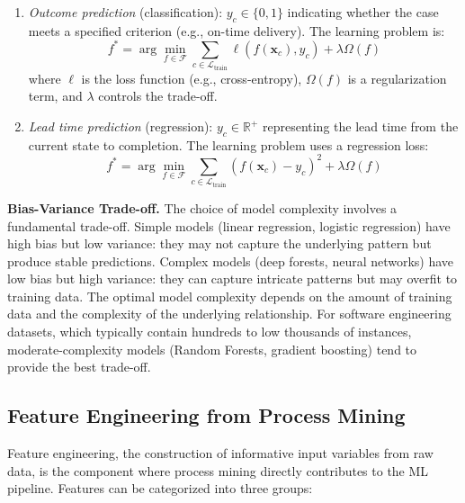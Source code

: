\begin{enumerate}
    \item \emph{Outcome prediction} (classification):
    $y_c \in \{0, 1\}$ indicating whether the case meets a specified
    criterion (e.g., on-time delivery). The learning problem is:
    \begin{equation}
    \label{eq:ml-classification}
    f^* = \arg\min_{f \in \mathcal{F}} \sum_{c \in \mathcal{L}_{\text{train}}}
    \ell(f(\mathbf{x}_c), y_c) + \lambda \Omega(f)
    \end{equation}
    where $\ell$ is the loss function (e.g., cross-entropy), $\Omega(f)$
    is a regularization term, and $\lambda$ controls the trade-off.

    \item \emph{Lead time prediction} (regression):
    $y_c \in \mathbb{R}^+$ representing the lead time from the current
    state to completion. The learning problem uses a regression loss:
    \begin{equation}
    \label{eq:ml-regression}
    f^* = \arg\min_{f \in \mathcal{F}} \sum_{c \in \mathcal{L}_{\text{train}}}
    (f(\mathbf{x}_c) - y_c)^2 + \lambda \Omega(f)
    \end{equation}
\end{enumerate}

\textbf{Bias-Variance Trade-off.} The choice of model complexity involves
a fundamental trade-off. Simple models (linear regression, logistic
regression) have high bias but low variance: they may not capture the
underlying pattern but produce stable predictions. Complex models (deep
forests, neural networks) have low bias but high variance: they can
capture intricate patterns but may overfit to training data. The optimal
model complexity depends on the amount of training data and the
complexity of the underlying relationship. For software engineering
datasets, which typically contain hundreds to low thousands of instances,
moderate-complexity models (Random Forests, gradient boosting) tend to
provide the best trade-off.


\subsection{Feature Engineering from Process Mining}
\label{sec:ml-feature-eng}

Feature engineering, the construction of informative input variables from
raw data, is the component where process mining directly contributes to
the ML pipeline. Features can be categorized into three groups:

